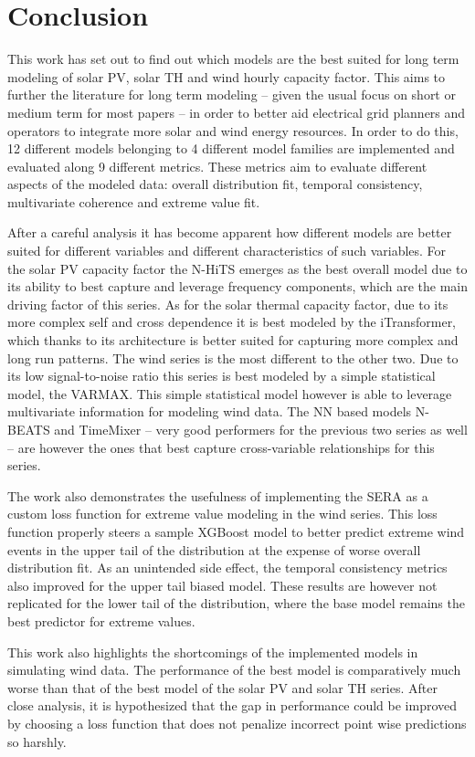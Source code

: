 \section{Conclusion}
This work has set out to find out which models are the best suited for long term modeling of solar PV, solar TH and wind hourly capacity factor. This aims to further the literature for long term modeling -- given the usual focus on short or medium term for most papers -- in order to better aid electrical grid planners and operators to integrate more solar and wind energy resources. In order to do this, 12 different models belonging to 4 different model families are implemented and evaluated along 9 different metrics. These metrics aim to evaluate different aspects of the modeled data: overall distribution fit, temporal consistency, multivariate coherence and extreme value fit. 

After a careful analysis it has become apparent how different models are better suited for different variables and different characteristics of such variables. For the solar PV capacity factor the N-HiTS emerges as the best overall model due to its ability to best capture and leverage frequency components, which are the main driving factor of this series. %
As for the solar thermal capacity factor, due to its more complex self and cross dependence it is best modeled by the iTransformer, which thanks to its architecture is better suited for capturing more complex and long run patterns. 
The wind series is the most different to the other two. Due to its low signal-to-noise ratio this series is best modeled by a simple statistical model, the VARMAX. This simple statistical model however is able to leverage multivariate information for modeling wind data. The NN based models N-BEATS and TimeMixer -- very good performers for the previous two series as well -- are however the ones that best capture cross-variable relationships for this series. 

The work also demonstrates the usefulness of implementing the SERA as a custom loss function for extreme value modeling in the wind series. This loss function properly steers a sample XGBoost model to better predict extreme wind events in the upper tail of the distribution at the expense of worse overall distribution fit. As an unintended side effect, the temporal consistency metrics also improved for the upper tail biased model. These results are however not replicated for the lower tail of the distribution, where the base model remains the best predictor for extreme values. 

This work also highlights the shortcomings of the implemented models in simulating wind data. The performance of the best model is comparatively much worse than that of the best model of the solar PV and solar TH series. After close analysis, it is hypothesized that the gap in performance could be improved by choosing a loss function that does not penalize incorrect point wise predictions so harshly.